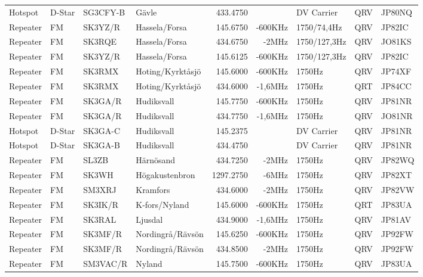 \begin{landscape}
\begin{longtable}{llllrrlcl}
Hotspot  & D-Star & SG3CFY-B & Gävle            & 433.4750  &          & DV Carrier    & QRV & JP80NQ \\
Repeater & FM     & SK3YZ/R  & Hassela/Forsa    & 145.6750  & -600KHz  & 1750/74,4Hz   & QRV & JP82IC \\
Repeater & FM     & SK3RQE   & Hassela/Forsa    & 434.6750  & -2MHz    & 1750/127,3Hz  & QRV & JO81KS \\
Repeater & FM     & SK3YZ/R  & Hassela/Forsa    & 145.6125  & -600KHz  & 1750/127,3Hz  & QRV & JP82IC \\
Repeater & FM     & SK3RMX   & Hoting/Kyrktåsjö & 145.6000  & -600KHz  & 1750Hz        & QRV & JP74XF \\
Repeater & FM     & SK3RMX   & Hoting/Kyrktåsjö & 434.6000  & -1,6MHz  & 1750Hz        & QRT & JP84CC \\
Repeater & FM     & SK3GA/R  & Hudiksvall       & 145.7750  & -600KHz  & 1750Hz        & QRV & JP81NR \\
Repeater & FM     & SK3GA/R  & Hudiksvall       & 434.7750  & -1,6MHz  & 1750Hz        & QRV & JO81NR \\
Hotspot  & D-Star & SK3GA-C  & Hudiksvall       & 145.2375  &          & DV Carrier    & QRV & JP81NR \\
Hotspot  & D-Star & SK3GA-B  & Hudiksvall       & 434.4750  &          & DV Carrier    & QRV & JP81NR \\
Repeater & FM     & SL3ZB    & Härnösand        & 434.7250  & -2MHz    & 1750Hz        & QRV & JP82WQ \\
Repeater & FM     & SK3WH    & Högakustenbron   & 1297.2750 & -6MHz    & 1750Hz        & QRV & JP82XT \\
Repeater & FM     & SM3XRJ   & Kramfors         & 434.6000  & -2MHz    & 1750Hz        & QRV & JP82VW \\
Repeater & FM     & SK3IK/R  & K-fors/Nyland    & 145.6000  & -600KHz  & 1750Hz        & QRT & JP83UA \\
Repeater & FM     & SK3RAL   & Ljusdal          & 434.9000  & -1,6MHz  & 1750Hz        & QRV & JP81AV \\
Repeater & FM     & SK3MF/R  & Nordingrå/Rävsön & 145.6250  & -600KHz  & 1750Hz        & QRV & JP92FW \\
Repeater & FM     & SK3MF/R  & Nordingrå/Rävsön & 434.8500  & -2MHz    & 1750Hz        & QRV & JP92FW \\
Repeater & FM     & SM3VAC/R & Nyland           & 145.7500  & -600KHz  & 1750Hz        & QRV & JP83UA \\

\end{longtable}
\end{landscape}
